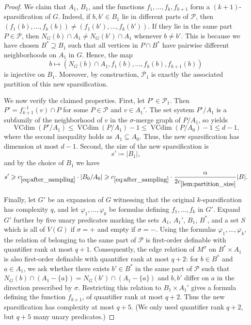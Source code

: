 \documentclass[11pt]{article}
\theoremstyle{definition}
\newcommand{\inducedSS}[2]{#1/#2}%
\renewcommand{\le}{\leqslant}
\renewcommand{\ge}{\geqslant}
\renewcommand{\subset}{\subseteq}
\newcommand{\set}[1]{\{#1\}}
\renewcommand{\cal}{\mathcal}
\DeclareMathOperator{\VCdim}{VCdim}
\let\phi\varphi
\begin{document}
\begin{proof}
We claim that $A_1$, $B_1$, and the functions
$f_1,\ldots,f_k,f_{k+1}$ form a $(k+1)$-sparsification of $G$.
Indeed, if $b,b'\in B_1$ lie in different parts of $\cal P$, then
$(f_1(b),\ldots,f_k(b))\neq (f_1(b'),\ldots,f_k(b'))$.
If they lie in the same part $P\in\cal P$, then 
$N_G(b)\cap A_1\neq N_G(b')\cap A_1$ whenever $b\neq b'$.
This is because we have chosen $B^* \supseteq B_1$ such that all vertices in $P \cap B^*$ have pairwise different neighborhoods on $A_1$ in $G$.
Hence, the map
\[
  b\mapsto (N_G(b)\cap A_1,f_1(b),\ldots,f_k(b),f_{k+1}(b))
\]
is injective on $B_1$.
Moreover, by construction, $\cal P_1$ is exactly the associated partition of
this new sparsification.

We now verify the claimed properties.
First, let $P'\in\cal P_1$.
Then $P'=f_{k+1}^{-1}(v)\cap P$ for some $P\in\cal P$ and $v\in A_1'$.
The set system $\inducedSS{P'}{A_1}$ is a subfamily of the neighborhood of $v$
in the $\sigma$-merge graph of $\inducedSS{P}{A_1}$, so
 yields
\[
  \VCdim(\inducedSS{P'}{A_1})\le \VCdim(\inducedSS{P}{A_1}) - 1 \le \VCdim(\inducedSS{P}{A_0}) - 1 \le d-1,
\]
where the second inequality holds as $A_1\subset A_0$.
Thus, the new sparsification has dimension at most $d-1$.
Second, the size of the new sparsification is
\[
  s'\coloneqq |B_1|,
\]
and by the choice of $B_1$ we have
\[
  s' \ge c_{\cref{eq:after_sampling}} \cdot |\inducedSS{B_0}{A_0}| \ge c_{\cref{eq:after_sampling}} \cdot  \frac{\alpha}{2 c_{\ref{lem:partition_size}}} |B|.
\]

Finally, let $G'$ be an expansion of $G$ witnessing that the original
$k$-sparsification has complexity $q$,
and let $\phi_1,\ldots,\phi_k$ be formulas defining
$f_1,\ldots,f_k$ in $G'$.
Expand $G'$ further by five unary predicates marking the sets
$A_1$, $A_1'$, $B_1$, $B^*$, and a set $S$ which is all of $V(G)$ if
$\sigma=+$ and empty if $\sigma=-$.
Using the formulas $\phi_1,\ldots,\phi_k$, the relation of belonging to the
same part of $\cal P$ is first-order definable with quantifier rank at most
$q+1$.
Consequently, the edge relation of $M^\sigma$ on $B^*\times A_1$ is also
first-order definable with quantifier rank at most $q+2$:
for $b\in B^*$ and $a\in A_1$, we ask whether there exists
$b'\in B^*$ in the same part of $\cal P$ such that
$N_G(b)\cap (A_1-\set{a})=N_G(b')\cap (A_1-\set{a})$ and
$b,b'$ differ on $a$ in the direction prescribed by $\sigma$.
Restricting this relation to $B_1\times A_1'$ gives a formula defining the
function $f_{k+1}$, of quantifier rank at most $q+2$.
Thus the new sparsification has complexity at most $q+5$.
(We only used quantifier rank $q + 2$, but $q+5$ many unary predicates.)
\end{proof}
\end{document}
